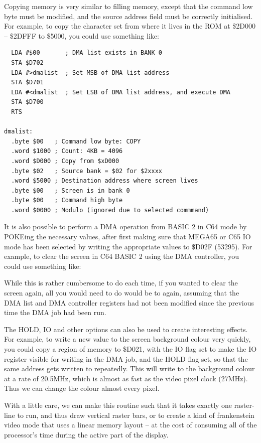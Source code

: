 Copying memory is very similar to filling memory, except that the command
low byte must be modified, and the source address field must be correctly initialised.
For example, to copy the character set from where it lives in the ROM at \$2D000 -- \$2DFFF
to \$5000, you could use something like:

\begin{tcolorbox}[colback=black,coltext=white]
\verbatimfont{\codefont}
\begin{verbatim}
  LDA #$00       ; DMA list exists in BANK 0
  STA $D702
  LDA #>dmalist  ; Set MSB of DMA list address
  STA $D701
  LDA #<dmalist  ; Set LSB of DMA list address, and execute DMA
  STA $D700
  RTS

dmalist:
  .byte $00   ; Command low byte: COPY
  .word $1000 ; Count: 4KB = 4096
  .word $D000 ; Copy from $xD000
  .byte $02   ; Source bank = $02 for $2xxxx
  .word $5000 ; Destination address where screen lives
  .byte $00   ; Screen is in bank 0
  .byte $00   ; Command high byte
  .word $0000 ; Modulo (ignored due to selected commmand)
\end{verbatim}
\end{tcolorbox}

It is also possible to perform a DMA operation from BASIC 2 in C64
mode by POKEing the necessary values, after first making sure that
MEGA65 or C65 IO mode has been selected by writing the appropriate
values to \$D02F (53295). For example, to clear the screen in C64 BASIC 2
using the DMA controller, you could use something like:



While this is rather cumbersome to do each time, if you wanted to clear
the screen again, all you would need to do would be to  again,
assuming that the DMA list and DMA controller registers had not been modified
since the previous time the DMA job had been run.

The HOLD, IO and other options can also be used to create interesting effects.
For example, to write a new value to the screen background colour very quickly,
you could copy a region of memory to \$D021, with the IO flag set to make the IO
register visible for writing in the DMA job, and the HOLD flag set, so that the
same address gets written to repeatedly. This will write to the background colour
at a rate of 20.5MHz, which is almost as fast as the video pixel clock (27MHz).
Thus we can change the colour almost every pixel.

With a little care, we can make this routine such that it takes exactly one raster-line
to run, and thus draw vertical raster bars, or to create a kind of frankenstein video mode
that uses a linear memory layout -- at the cost of consuming all of the processor's time
during the active part of the display.

